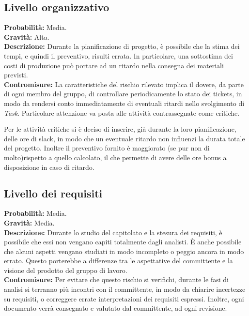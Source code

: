 \documentclass[a4paper]{article}
\begin{document}
		\subsection{Livello organizzativo}
			\textbf{Probabilità:} Media.
			\\ 
			\textbf{Gravità:} Alta.
			\\ 
			\textbf{Descrizione:} Durante la pianificazione di progetto, è possibile che la stima dei tempi, e quindi il
				preventivo, risulti errata. In particolare, una sottostima dei costi di produzione può 
				portare ad un ritardo nella consegna dei materiali previsti. 
			\\ 
			\textbf{Contromisure:} La caratteristiche del rischio rilevato implica il dovere, da parte di ogni membro del 
				gruppo, di controllare periodicamente lo stato dei tickets, in modo da rendersi conto 
				immediatamente di eventuali ritardi nello svolgimento di \emph{Task}. Particolare attenzione
				va posta alle attività contrassegnate come critiche. 
				
				Per le attività critiche si è deciso di inserire, già durante la loro pianificazione, delle 
				ore di slack, in modo che un eventuale ritardo non influenzi la durata totale del progetto. 
				Inoltre il preventivo fornito è maggiorato (se pur non di molto)rispetto a quello calcolato, 
				il che permette di avere delle ore bonus a disposizione in caso di ritardo.
		\subsection{Livello dei requisiti}
			\textbf{Probabilità:} Media.
			\\ 
			\textbf{Gravità:} Media.
			\\ 
			\textbf{Descrizione:} Durante lo studio del capitolato e la stesura dei requisiti, è possibile che essi non vengano 
				capiti totalmente dagli analisti. È anche possibile che alcuni aspetti vengano studiati in modo 
				incompleto o peggio ancora in modo errato. Questo porterebbe a differenze tra le aspettative del 
				committente e la visione del prodotto del gruppo di lavoro.
			\\ 
			\textbf{Contromisure:} Per evitare che questo rischio si verifichi, durante le fasi di analisi si terranno più incontri 
				con il committente, in modo da chiarire incertezze su requisiti, o correggere errate interpretazioni 
				dei requisiti espressi. Inoltre, ogni documento verrà consegnato e valutato dal committente, ad ogni 
				revisione.
				
\end{document}
